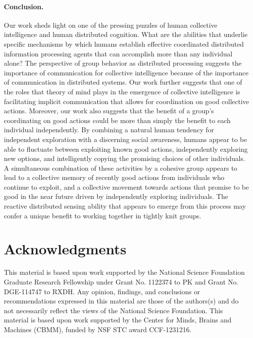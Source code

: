 \documentclass[12pt,letterpaper]{article}
\begin{document}
\paragraph{Conclusion.}

Our work sheds light on one of the pressing puzzles of
human collective intelligence and human distributed cognition.  What
are the abilities that underlie specific mechanisms by which humans establish effective
coordinated distributed information processing agents that can
accomplish more than any individual alone?  The perspective of group behavior as
distributed processing \cite{hutchins_cognition_1995} suggests the
importance of communication for collective intelligence because of the
importance of communication in distributed systems.  
Our work further
suggests that one of the roles that theory of mind plays in the
emergence of collective intelligence is facilitating implicit
communication that allows for coordination on good collective actions.
Moreover, our work also suggests that the benefit of a group's
coordinating on good actions could be more than simply the benefit to
each individual independently.  By combining a natural human tendency
for independent exploration with a discerning social awareness, humans
appear to be able to fluctuate between exploiting known good actions,
independently exploring new options, and intelligently copying the
promising choices of other individuals.  A simultaneous combination of
these activities by a cohesive group appears to lead to a collective
memory of recently good actions from individuals who continue to
exploit, and a collective movement towards actions that promise to be
good in the near future driven by independently exploring individuals.
The reactive distributed sensing ability that appears to emerge from
this process may confer a unique benefit to working together in
tightly knit groups.

\section{Acknowledgments}

\small

This material is based upon work supported by the National Science
Foundation Graduate Research Fellowship under Grant No. 1122374 to PK
and Grant No. DGE-114747 to RXDH. Any opinion, findings, and
conclusions or recommendations expressed in this material are those of
the authors(s) and do not necessarily reflect the views of the
National Science Foundation.  This material is based upon work
supported by the Center for Minds, Brains and Machines (CBMM), funded
by NSF STC award CCF-1231216.
\end{document}
